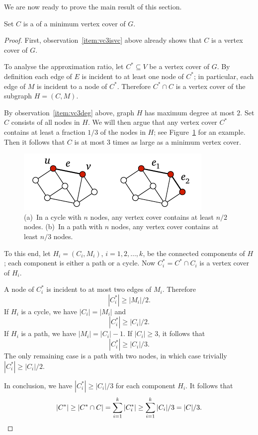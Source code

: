 We are now ready to prove the main result of this section.
\begin{lemma}
    Set $C$ is a  of a minimum vertex cover of $G$.
\end{lemma}
\begin{proof}
    First, observation~\ref{item:vc3isvc} above already shows that $C$ is a vertex cover of $G$.
    
    To analyse the approximation ratio, let $C^* \subseteq V$ be a vertex cover of $G$. By definition each edge of $E$ is incident to at least one node of $C^*$; in particular, each edge of $M$ is incident to a node of $C^*$. Therefore $C^* \cap C$ is a vertex cover of the subgraph $H = (C,M)$.
    
    By observation~\ref{item:vc3deg} above, graph $H$ has maximum degree at most $2$. Set $C$ consists of all nodes in $H$. We will then argue that any vertex cover $C^*$ contains at least a fraction $1/3$ of the nodes in $H$; see Figure~\ref{fig:vc3c} for an example. Then it follows that $C$ is at most $3$ times as large as a minimum vertex cover.

\begin{figure}
    \centering
    \includegraphics[page=\PVCThreeApxC]{figs.pdf}
    \caption{(a)~In a cycle with $n$ nodes, any vertex cover contains at least $n/2$ nodes. (b)~In a path with $n$ nodes, any vertex cover contains at least $n/3$ nodes.}\label{fig:vc3c}
\end{figure}
    
    To this end, let $H_i = (C_i,M_i)$, $i = 1, 2, \dotsc, k$, be the connected components of $H$; each component is either a path or a cycle. Now $C_i^* = C^* \cap C_i$ is a vertex cover of $H_i$.

    A node of $C_i^*$ is incident to at most two edges of $M_i$. Therefore
    \[
        |C_i^*| \ge |M_i|/2.
    \]
    If $H_i$ is a cycle, we have $|C_i| = |M_i|$ and
    \[
        |C_i^*| \ge |C_i|/2.
    \]
    If $H_i$ is a path, we have $|M_i| = |C_i| - 1$. If $|C_i| \ge 3$, it follows that
    \[
        |C_i^*| \ge |C_i|/3.
    \]
    The only remaining case is a path with two nodes, in which case trivially $|C_i^*| \ge |C_i|/2$.

    In conclusion, we have $|C_i^*| \ge |C_i|/3$ for each component $H_i$. It follows that
    \[
        |C^*| \ge |C^* \cap C| = \sum_{i=1}^k |C_i^*| \ge \sum_{i=1}^k |C_i|/3 = |C|/3. \qedhere
    \]
\end{proof}

